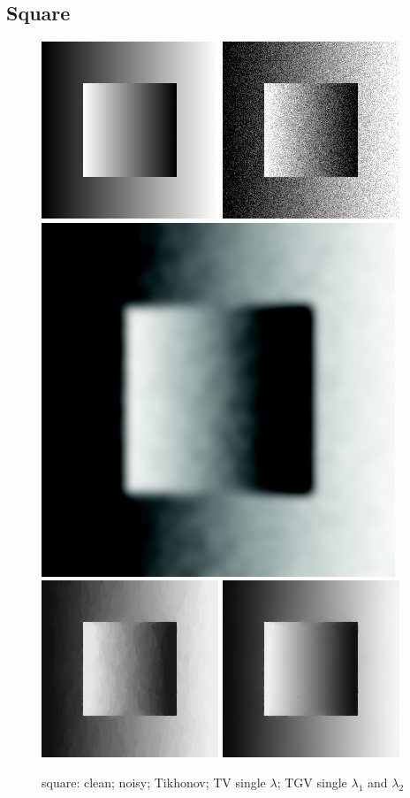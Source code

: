 \documentclass[12pt]{article}
\begin{document}
\subsection{Square}

\begin{figure}[h]
    \centering
    \includegraphics[width=0.19\linewidth]{images/tests/square clean.png}
    \includegraphics[width=0.19\linewidth]{images/tests/square noisy.png}
    \includegraphics[width=0.19\linewidth]{images/tests/square tikhonov.png}
    \includegraphics[width=0.19\linewidth]{images/tests/square TV single lambda.png}
    \includegraphics[width=0.19\linewidth]{images/tests/square TGV single lambdas.png}
    \caption{square: clean; noisy; Tikhonov; TV single $\lambda$; TGV single $\lambda_1$ and $\lambda_2$}
    \label{fig:square_clean}
\end{figure}

\end{document}
